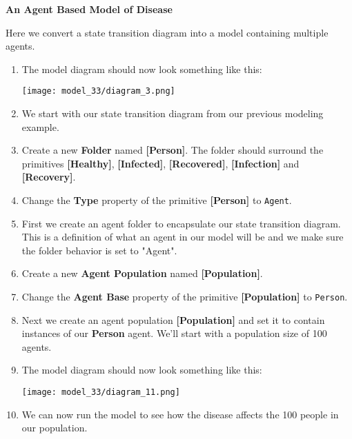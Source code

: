 \documentclass[]{memoir}
\makeatletter
\def\maxwidth{\ifdim\Gin@nat@width>\linewidth\linewidth
\else\Gin@nat@width\fi}
\let\Oldincludegraphics\includegraphics
\renewcommand{\includegraphics}[1]{\Oldincludegraphics[width=\maxwidth]{#1}}
\newcommand{\p}[1]{\textbf{{[}#1{]}}}
\newcommand{\e}[1]{\texttt{#1}}
\renewcommand{\a}[1]{\textbf{#1}}
\makeatother
\begin{document}
\FloatBarrier 

\begin{oframed}\textbf{An Agent Based Model of Disease} 

 Here we convert a state transition diagram into a model containing multiple agents.

\begin{enumerate}
\item The model diagram should now look something like this: \par \begin{minipage}{\linewidth}  \centering \texttt{[image: model\_33/diagram\_3.png]}
\end{minipage}
\item 

We start with our state transition diagram from our previous modeling example.


\item Create a new \a{Folder} named \p{Person}. The folder should surround the primitives \p{Healthy}, \p{Infected}, \p{Recovered}, \p{Infection} and \p{Recovery}.
\item  Change the \a{Type} property of the primitive \p{Person} to \e{Agent}.
\item 

First we create an agent folder to encapsulate our state transition diagram. This is a definition of what an agent in our model will be and we make sure the folder behavior is set to "Agent".


\item Create a new \a{Agent Population} named \p{Population}.
\item  Change the \a{Agent Base} property of the primitive \p{Population} to \e{Person}.
\item 

Next we create an agent population \p{Population} and set it to contain instances of our \textbf{Person} agent. We'll start with a population size of 100 agents.


\item The model diagram should now look something like this: \par \begin{minipage}{\linewidth}  \centering \texttt{[image: model\_33/diagram\_11.png]}
\end{minipage}
\item 

We can now run the model to see how the disease affects the 100 people in our population.



\end{enumerate}
\end{oframed}
\end{document}
